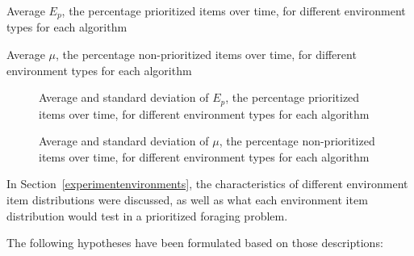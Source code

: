 \begin{table} [h]
     \caption{Average $E_p $, the percentage prioritized items over time, for different environment types for each algorithm}
     \label{environmenttypeprioritized}
	\centering
	\footnotesize
	
\end{table}

\begin{table} [h]
     \caption{Average $\mu$, the percentage non-prioritized items over time, for different environment types for each algorithm}
     \label{environmenttypenonprioritized}
	\centering
	\footnotesize
	
\end{table}

\begin{figure}[!htb]
\centering
\resizebox{0.8\textwidth}{!}{}
\caption{Average and standard deviation of $E_p $, the percentage prioritized items over time, for different environment types for each algorithm}
\label{fig:environmenttypes}
\end{figure}


\begin{figure}[!htb]
\centering
\resizebox{0.8\textwidth}{!}{}
\caption{Average and standard deviation of $\mu$, the percentage non-prioritized items over time, for different environment types for each algorithm}
\label{fig:environmenttypesnonprioritized}
\end{figure}

In Section~\ref{experimentenvironments}, the characteristics of different environment item distributions were discussed, as well as what each environment item distribution would test in a prioritized foraging problem. 

The following hypotheses have been formulated based on those descriptions:

